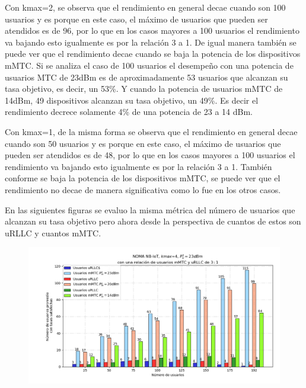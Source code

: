 Con kmax=2, se observa que el rendimiento en general decae cuando son 100 usuarios y es porque en este caso, el máximo de usuarios que pueden ser atendidos es de 96, por lo que en los casos mayores a 100 usuarios el rendimiento va bajando esto igualmente es por la relación 3 a 1. De igual manera también se puede ver que el rendimiento decae cuando se baja la potencia de los dispositivos mMTC. Si se analiza el caso de 100 usuarios el desempeño con una potencia de usuarios MTC de 23dBm es de aproximadamente 53 usuarios que alcanzan su tasa objetivo, es decir, un 53\%. Y cuando la potencia de usuarios mMTC de 14dBm, 49 dispositivos alcanzan su tasa objetivo, un 49\%. Es decir el rendimiento decrece solamente 4\% de una potencia de 23 a 14 dBm.\newline

Con kmax=1, de la misma forma se observa que el rendimiento en general decae cuando son 50 usuarios y es porque en este caso, el máximo de usuarios que pueden ser atendidos es de 48, por lo que en los casos mayores a 100 usuarios el rendimiento va bajando esto igualmente es por la relación 3 a 1. También conforme se baja la potencia de los dispositivos mMTC, se puede ver que el rendimiento no decae de manera significativa como lo fue en los otros casos. 

En las siguientes figuras se evaluo la misma métrica del número de usuarios que alcanzan su tasa objetivo pero ahora desde la perspectiva de cuantos de estos son uRLLC y cuantos mMTC.\newline


\begin{figure}[th]
    \centering
    \includegraphics[scale=.6]{Figures/ResultadosNOMA/Kmax4_DiferentesPM.png}
    \decoRule
    \caption[]{}
    \label{fig:Kmax4_DiferentesPM}
\end{figure}

